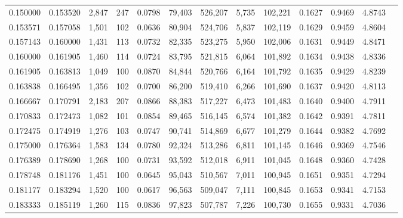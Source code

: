 \begin{tabular}{rrrrrrrrrrrrr}
0.150000 & 0.153520 &  2,847 &   247 &                                     0.0798 &  79,403 & 526,207 &   5,735 & 102,221 & 0.1627 & 0.9469 & 4.8743 \\
0.153571 & 0.157058 &  1,501 &   102 &                                     0.0636 &  80,904 & 524,706 &   5,837 & 102,119 & 0.1629 & 0.9459 & 4.8604 \\
0.157143 & 0.160000 &  1,431 &   113 &                                     0.0732 &  82,335 & 523,275 &   5,950 & 102,006 & 0.1631 & 0.9449 & 4.8471 \\
0.160000 & 0.161905 &  1,460 &   114 &                                     0.0724 &  83,795 & 521,815 &   6,064 & 101,892 & 0.1634 & 0.9438 & 4.8336 \\
0.161905 & 0.163813 &  1,049 &   100 &                                     0.0870 &  84,844 & 520,766 &   6,164 & 101,792 & 0.1635 & 0.9429 & 4.8239 \\
0.163838 & 0.166495 &  1,356 &   102 &                                     0.0700 &  86,200 & 519,410 &   6,266 & 101,690 & 0.1637 & 0.9420 & 4.8113 \\
0.166667 & 0.170791 &  2,183 &   207 &                                     0.0866 &  88,383 & 517,227 &   6,473 & 101,483 & 0.1640 & 0.9400 & 4.7911 \\
0.170833 & 0.172473 &  1,082 &   101 &                                     0.0854 &  89,465 & 516,145 &   6,574 & 101,382 & 0.1642 & 0.9391 & 4.7811 \\
0.172475 & 0.174919 &  1,276 &   103 &                                     0.0747 &  90,741 & 514,869 &   6,677 & 101,279 & 0.1644 & 0.9382 & 4.7692 \\
0.175000 & 0.176364 &  1,583 &   134 &                                     0.0780 &  92,324 & 513,286 &   6,811 & 101,145 & 0.1646 & 0.9369 & 4.7546 \\
0.176389 & 0.178690 &  1,268 &   100 &                                     0.0731 &  93,592 & 512,018 &   6,911 & 101,045 & 0.1648 & 0.9360 & 4.7428 \\
0.178748 & 0.181176 &  1,451 &   100 &                                     0.0645 &  95,043 & 510,567 &   7,011 & 100,945 & 0.1651 & 0.9351 & 4.7294 \\
0.181177 & 0.183294 &  1,520 &   100 &                                     0.0617 &  96,563 & 509,047 &   7,111 & 100,845 & 0.1653 & 0.9341 & 4.7153 \\
0.183333 & 0.185119 &  1,260 &   115 &                                     0.0836 &  97,823 & 507,787 &   7,226 & 100,730 & 0.1655 & 0.9331 & 4.7036 \\

\end{tabular}
